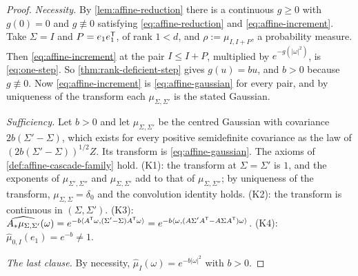 \begin{proof}
\leanok
\emph{Necessity.} By \ref{lem:affine-reduction} there is a continuous $g \ge 0$ with $g(0) = 0$
and $g \not\equiv 0$ satisfying \ref{eq:affine-reduction} and \ref{eq:affine-increment}. Take
$\Sigma = I$ and $P = e_1e_1^{\mathsf{T}}$, of rank $1 < d$, and $\rho := \mu_{I,I+P}$, a probability
measure. Then \ref{eq:affine-increment} at the pair $I \le I + P$, multiplied by
$e^{-g(|\omega|^2)}$, is \ref{eq:one-step}. So \ref{thm:rank-deficient-step} gives $g(u) = bu$,
and $b > 0$ because $g \not\equiv 0$. Now \ref{eq:affine-increment} is \ref{eq:affine-gaussian} for
every pair, and by uniqueness of the transform each $\mu_{\Sigma,\Sigma'}$ is the stated Gaussian.

\emph{Sufficiency.} Let $b > 0$ and let $\mu_{\Sigma,\Sigma'}$ be the centred Gaussian with
covariance $2b(\Sigma'-\Sigma)$, which exists for every positive semidefinite covariance as the law
of $(2b(\Sigma'-\Sigma))^{1/2}Z$. Its transform is \ref{eq:affine-gaussian}. The axioms of
\ref{def:affine-cascade-family} hold. (K1): the transform
at $\Sigma = \Sigma'$ is $1$, and the exponents of $\mu_{\Sigma',\Sigma''}$ and
$\mu_{\Sigma,\Sigma'}$ add to that of $\mu_{\Sigma,\Sigma''}$; by uniqueness of the transform,
$\mu_{\Sigma,\Sigma} = \delta_0$ and the convolution identity holds. (K2): the transform is
continuous in $(\Sigma,\Sigma')$. (K3): $\widehat{A_*\mu_{\Sigma,\Sigma'}}(\omega)
= e^{-b\langle A^{\mathsf{T}}\omega,(\Sigma'-\Sigma)A^{\mathsf{T}}\omega\rangle}
= e^{-b\langle\omega,(A\Sigma'A^{\mathsf{T}} - A\Sigma A^{\mathsf{T}})\omega\rangle}$. (K4):
$\widehat\mu_{0,I}(e_1) = e^{-b} \ne 1$.

\emph{The last clause.} By necessity, $\widehat\mu_I(\omega) = e^{-b|\omega|^2}$ with $b > 0$.
\end{proof}

